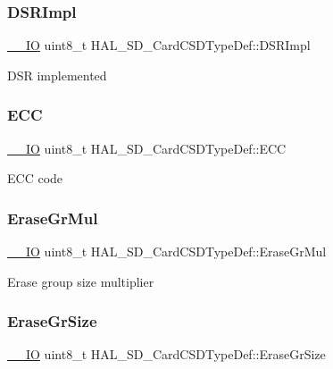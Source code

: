 \subsubsection{\texorpdfstring{DSRImpl}{DSRImpl}}
{\footnotesize\ttfamily \mbox{\hyperlink{core__sc300_8h_aec43007d9998a0a0e01faede4133d6be}{\+\_\+\+\_\+\+IO}} uint8\+\_\+t H\+A\+L\+\_\+\+S\+D\+\_\+\+Card\+C\+S\+D\+Type\+Def\+::\+D\+S\+R\+Impl}

D\+SR implemented \mbox{\label{struct_h_a_l___s_d___card_c_s_d_type_def_a8991c0e5e94ad2a7011ac8a79df18321}} 
\subsubsection{\texorpdfstring{ECC}{ECC}}
{\footnotesize\ttfamily \mbox{\hyperlink{core__sc300_8h_aec43007d9998a0a0e01faede4133d6be}{\+\_\+\+\_\+\+IO}} uint8\+\_\+t H\+A\+L\+\_\+\+S\+D\+\_\+\+Card\+C\+S\+D\+Type\+Def\+::\+E\+CC}

E\+CC code \mbox{\label{struct_h_a_l___s_d___card_c_s_d_type_def_a7ef7e1b3d93f419faee63e1f3f8f0d97}} 
\subsubsection{\texorpdfstring{EraseGrMul}{EraseGrMul}}
{\footnotesize\ttfamily \mbox{\hyperlink{core__sc300_8h_aec43007d9998a0a0e01faede4133d6be}{\+\_\+\+\_\+\+IO}} uint8\+\_\+t H\+A\+L\+\_\+\+S\+D\+\_\+\+Card\+C\+S\+D\+Type\+Def\+::\+Erase\+Gr\+Mul}

Erase group size multiplier \mbox{\label{struct_h_a_l___s_d___card_c_s_d_type_def_aba1bd43d3867155afe827c7f4540c29b}} 
\subsubsection{\texorpdfstring{EraseGrSize}{EraseGrSize}}
{\footnotesize\ttfamily \mbox{\hyperlink{core__sc300_8h_aec43007d9998a0a0e01faede4133d6be}{\+\_\+\+\_\+\+IO}} uint8\+\_\+t H\+A\+L\+\_\+\+S\+D\+\_\+\+Card\+C\+S\+D\+Type\+Def\+::\+Erase\+Gr\+Size}


